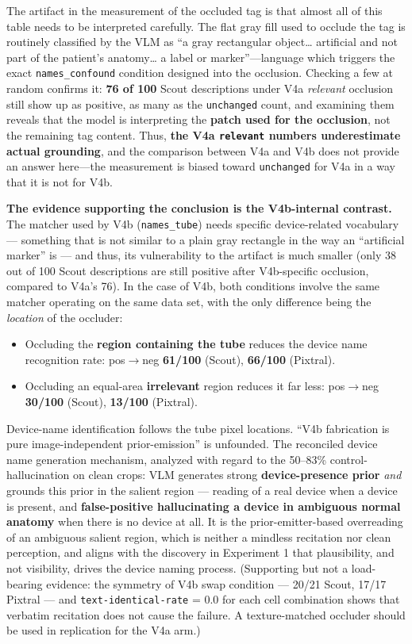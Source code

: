 \documentclass{ieeeaccess}
\begin{document}
The artifact in the measurement of the occluded tag is that almost all of this table needs to be interpreted carefully. The flat gray fill used to occlude the tag is routinely classified by the VLM as ``a gray rectangular object\ldots{} artificial and not part of the patient's anatomy\ldots{} a label or marker''---language which triggers the exact \texttt{names\_confound} condition designed into the occlusion. Checking a few at random confirms it: \textbf{76 of 100} Scout descriptions under V4a \emph{relevant} occlusion still show up as positive, as many as the \texttt{unchanged} count, and examining them reveals that the model is interpreting the \textbf{patch used for the occlusion}, not the remaining tag content. Thus, \textbf{the V4a \texttt{relevant} numbers underestimate actual grounding}, and the comparison between V4a and V4b does not provide an answer here---the measurement is biased toward \texttt{unchanged} for V4a in a way that it is not for V4b.

\textbf{The evidence supporting the conclusion is the V4b-internal contrast.} The matcher used by V4b (\texttt{names\_tube}) needs specific device-related vocabulary --- something that is not similar to a plain gray rectangle in the way an ``artificial marker'' is --- and thus, its vulnerability to the artifact is much smaller (only 38 out of 100 Scout descriptions are still positive after V4b-specific occlusion, compared to V4a's 76). In the case of V4b, both conditions involve the same matcher operating on the same data set, with the only difference being the \emph{location} of the occluder:
\begin{itemize}
\item Occluding the \textbf{region containing the tube} reduces the device name recognition rate: pos$\rightarrow$neg \textbf{61/100} (Scout), \textbf{66/100} (Pixtral).
\item Occluding an equal-area \textbf{irrelevant} region reduces it far less: pos$\rightarrow$neg \textbf{30/100} (Scout), \textbf{13/100} (Pixtral).
\end{itemize}

Device-name identification follows the tube pixel locations. ``V4b fabrication is pure image-independent prior-emission'' is unfounded. The reconciled device name generation mechanism, analyzed with regard to the 50--83\% control-hallucination on clean crops: VLM generates strong \textbf{device-presence prior} \emph{and} grounds this prior in the salient region --- reading of a real device when a device is present, and \textbf{false-positive hallucinating a device in ambiguous normal anatomy} when there is no device at all. It is the prior-emitter-based overreading of an ambiguous salient region, which is neither a mindless recitation nor clean perception, and aligns with the discovery in Experiment 1 that plausibility, and not visibility, drives the device naming process. (Supporting but not a load-bearing evidence: the symmetry of V4b swap condition --- 20/21 Scout, 17/17 Pixtral --- and \texttt{text-identical-rate} = 0.0 for each cell combination shows that verbatim recitation does not cause the failure. A texture-matched occluder should be used in replication for the V4a arm.)
\end{document}
